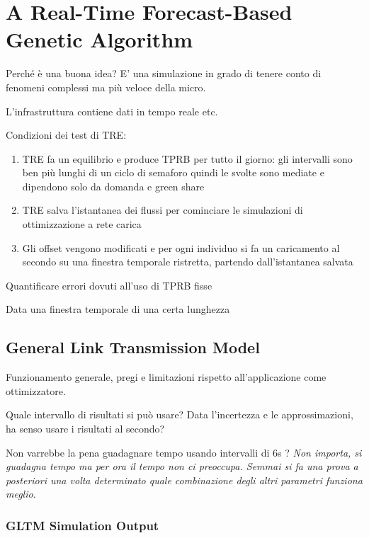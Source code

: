 \chapter{A Real-Time Forecast-Based Genetic Algorithm}
Perché è una buona idea?
E' una simulazione in grado di tenere conto di fenomeni complessi ma più veloce della micro.

L'infrastruttura contiene dati in tempo reale etc.

Condizioni dei test di TRE:
\begin{enumerate}
\item TRE fa un equilibrio e produce TPRB per tutto il giorno: gli intervalli sono ben più lunghi di un ciclo di semaforo quindi le svolte sono mediate e dipendono solo da domanda e green share
\item TRE salva l'istantanea dei flussi per cominciare le simulazioni di ottimizzazione a rete carica
\item Gli offset vengono modificati e per ogni individuo si fa un caricamento al secondo su una finestra temporale ristretta, partendo dall'istantanea salvata
\end{enumerate}


Quantificare errori dovuti all'uso di TPRB fisse 

Data una finestra temporale di una certa lunghezza

\section{General Link Transmission Model}
Funzionamento generale, pregi e limitazioni rispetto all'applicazione come ottimizzatore.

Quale intervallo di risultati si può usare? Data l'incertezza e le approssimazioni, ha senso usare i risultati al secondo?

Non varrebbe la pena guadagnare tempo usando intervalli di 6s ?
\emph{Non importa, si guadagna tempo ma per ora il tempo non ci preoccupa. Semmai si fa una prova a posteriori una volta determinato quale combinazione degli altri parametri funziona meglio}.

\subsection{GLTM Simulation Output} \label{s:output}

